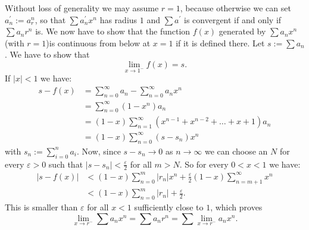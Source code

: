\documentclass[12pt]{article}
\begin{document}
Without loss of generality we may assume $r=1$, because otherwise we can set $a^\prime_n:=a_r^n$, so that $\sum a^\prime_nx^n$ has radius $1$ and $\sum a^\prime$ is convergent if and only if $\sum a_nr^n$ is.
We now have to show that the function $f(x)$ generated by $\sum a_nx^n$ (with $r=1$)is continuous from below at $x=1$ if it is defined there.
Let $s:=\sum a_n$. We have to show that 
$$\lim_{x\to1^-}f(x)=s.$$
If $|x|<1$ we have:
\begin{align*}
s-f(x)&=\sum_{n=0}^\infty a_n-\sum_{n=0}^\infty a_nx^n\\
&=\sum_{n=0}^\infty(1-x^n)a_n\\
&=(1-x)\sum_{n=1}^\infty(x^{n-1}+x^{n-2}+\dots+x+1)a_n\\
&=(1-x)\sum_{n=0}^\infty(s-s_n)x^n
\end{align*}
with $s_n:=\sum_{i=0}^na_i$. Now, since $s-s_n\to0$ as $n\to\infty$ we can choose an $N$ for every $\varepsilon>0$ such that $|s-s_n|<\frac{\varepsilon}{2}$ for all $m>N$. So for every $0<x<1$ we have:
\begin{align*}
|s-f(x)|&<(1-x)\sum_{n=0}^m|r_n|x^n+\frac{\varepsilon}{2}(1-x)\sum_{n=m+1}^\infty x^n\\
&<(1-x)\sum_{n=0}^m|r_n|+\frac{\varepsilon}{2}.
\end{align*}
This is smaller than $\varepsilon$ for all $x<1$ sufficiently close to $1$, which proves 
$$\lim_{x\to r^-}\sum a_nx^n=\sum a_nr^n=\sum\lim_{x\to r^-}a_nx^n.$$
\end{document}
